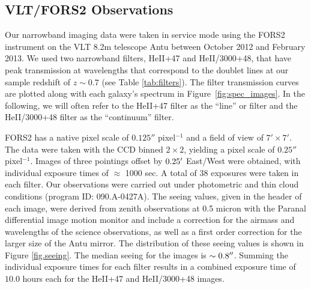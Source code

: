 \documentclass[trackchanges,twocolumn]{aastex62}
\begin{document}
\subsection{VLT/FORS2 Observations}
Our narrowband imaging data were taken in service mode using the FORS2 instrument on the VLT 8.2m telescope Antu between October 2012 and February 2013. 
We used two narrowband filters, HeII+47 and HeII/3000+48, that have peak transmission at wavelengths that correspond to the  doublet lines at our sample redshift of $z\sim0.7$ (see Table \ref{tab:filters}). The filter transmission curves are plotted along with each galaxy's spectrum in Figure~\ref{fig:spec_images}.
In the following, we will often refer to the HeII+47 filter as the ``line'' or  filter and the HeII/3000+48 filter as the ``continuum'' filter.

FORS2 has a native pixel scale of $0.125''$ pixel$^{-1}$ and a field of view of $7'\times7'$.  The data were taken with 
the CCD binned $2\times2$, yielding a pixel scale of $0.25''$ pixel$^{-1}$.
Images of three pointings offset by $0.25\mbox{$^\prime$}$ East/West were obtained, with individual exposure times of $\approx$ 1000 sec.  A total of 38  exposures were taken in each filter. 
Our observations were carried out under photometric and thin cloud conditions (program ID: 090.A-0427A). 
The seeing values, given in the header of each image, were derived from zenith observations at 0.5 micron with the Paranal differential image motion monitor \citep[DIMM;][]{Sarazin1990} and include a correction for the airmass and wavelengths of the science observations, as well as a first order correction for the larger size of the Antu mirror. The distribution of these seeing values is shown in Figure \ref{fig.seeing}. The median seeing for the images is $\sim 0.8\mbox{$^{\prime\prime}$}$. Summing the individual exposure times for each filter results in a combined exposure time of $10.0$ hours each for the HeII+47 and HeII/3000+48 images.
\end{document}
